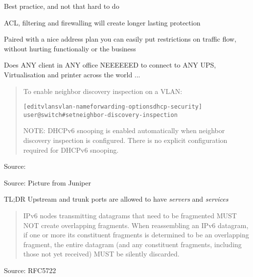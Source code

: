 \documentclass[Screen16to9,17pt]{foils}
\begin{document}
\begin{list2}
\item Best practice, and not that hard to do
\item ACL, filtering and firewalling will create longer lasting protection
\item Paired with a nice address plan you can easily put restrictions on traffic flow, without hurting functionaliy or the business
\item Does ANY client in ANY office NEEEEEED to connect to ANY UPS, Virtualisation and printer across the world ...
\end{list2}




\begin{quote}
To enable neighbor discovery inspection on a VLAN:
\begin{alltt}
[edit vlans vlan-name forwarding-options dhcp-security]
user@switch# set  neighbor-discovery-inspection
\end{alltt}

NOTE: DHCPv6 snooping is enabled automatically when neighbor discovery inspection is configured. There is no explicit configuration required for DHCPv6 snooping.
\end{quote}
Source: 



Source: Picture from Juniper {\small
{}}

\begin{list2}
\item TL;DR Upstream and trunk ports are allowed to have \emph{servers} and \emph{services}
\end{list2}




\begin{quote}
  IPv6 nodes transmitting datagrams that need to be fragmented MUST NOT
   create overlapping fragments.  When reassembling an IPv6 datagram, if
   one or more its constituent fragments is determined to be an
   overlapping fragment, the entire datagram (and any constituent
   fragments, including those not yet received) MUST be silently
   discarded.
\end{quote}
Source: RFC5722
\end{document}
